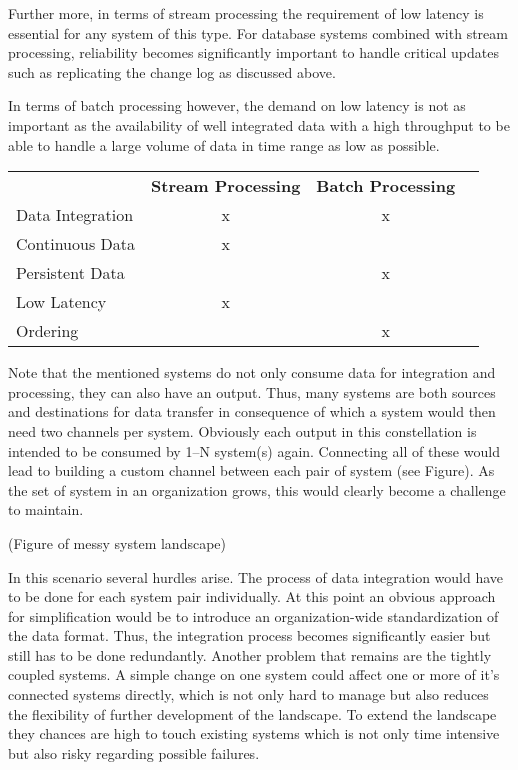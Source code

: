 Further more, in terms of stream processing the requirement of low latency is
essential for any system of this type. For database systems combined with stream
processing, reliability becomes significantly important to handle critical updates 
such as replicating the change log as discussed above.

In terms of batch processing however, the demand on low latency is not as
important as the availability of well integrated data with a high throughput to
be able to handle a large volume of data in time range as low as possible.

\begin{table}[h]
\begin{tabular}{l|c|cl}
\multicolumn{1}{c|}{\textbf{}} & \textbf{Stream Processing} & \textbf{Batch
Processing} & \multicolumn{1}{c}{\textbf{}} \\ \cline{1-3}
Data Integration               & x                          & x
&                               \\
Continuous Data                & x                          &
&                               \\
Persistent Data                &                            & x
&                               \\
Low Latency                    & x                          &
&                               \\
Ordering                       &                            & x
&
\end{tabular}
\end{table}

Note that the mentioned systems do not only consume data for integration and
processing, they can also have an output. Thus, many systems are both sources and
destinations for data transfer in consequence of which a system would then need
two channels  per system. 
Obviously each output in this constellation is intended to be consumed by 1--N
system(s) again. Connecting all of these would lead to building a custom
channel between each pair of system (see Figure). As the set of system in an organization
grows, this would clearly become a challenge to maintain.

(Figure of messy system landscape)

In this scenario several hurdles arise. The process of data integration would
have to be done for each system pair individually. At this point an obvious
approach for simplification would be to introduce an organization-wide
standardization of the data format. Thus, the integration process becomes 
significantly easier but still has to be done redundantly. Another problem that
remains are the tightly coupled systems. A simple change on one system could
affect one or more of it's connected systems directly, which is not only hard to
manage but also reduces the flexibility of further development of the landscape.
To extend the landscape they chances are high to touch existing systems which is
not only time intensive but also risky regarding possible failures.

